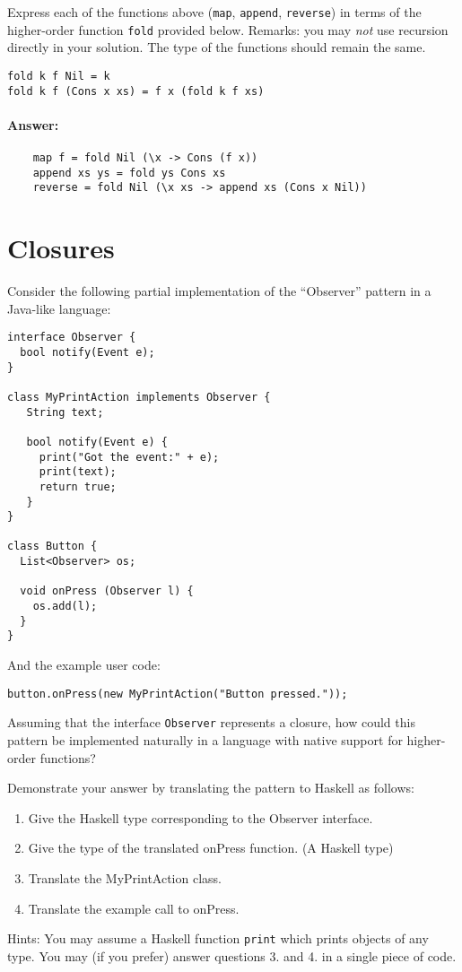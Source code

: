 \documentclass{article}
\newcommand{\answer}[0]{\paragraph{Answer:}}
\begin{document}
Express each of the functions above (\texttt{map}, \texttt{append},
\texttt{reverse})  in terms of the higher-order
function \texttt{fold} provided below.  Remarks: you may \emph{not}
use recursion directly in your solution. The type of the functions
should remain the same.

\begin{verbatim}
fold k f Nil = k
fold k f (Cons x xs) = f x (fold k f xs)
\end{verbatim}
\answer{
  \begin{verbatim}
    map f = fold Nil (\x -> Cons (f x))
    append xs ys = fold ys Cons xs
    reverse = fold Nil (\x xs -> append xs (Cons x Nil))
  \end{verbatim}
}
\newpage
\section{Closures}

Consider the following partial implementation of the ``Observer''
pattern in a Java-like language:
\begin{verbatim}
interface Observer {
  bool notify(Event e);
}

class MyPrintAction implements Observer {
   String text;

   bool notify(Event e) {
     print("Got the event:" + e);
     print(text);
     return true;
   }
}

class Button {
  List<Observer> os;

  void onPress (Observer l) {
    os.add(l);
  }
}
\end{verbatim}

And the example user code:

\begin{verbatim}
button.onPress(new MyPrintAction("Button pressed."));
\end{verbatim}

Assuming that the interface \texttt{Observer} represents a closure, how
could this pattern be implemented naturally in a language with native
support for higher-order functions?

Demonstrate your answer by translating the pattern to Haskell as
follows:
\begin{enumerate}
\item Give the Haskell type corresponding to the Observer interface.
\item Give the type of the translated onPress function. (A Haskell type) 
\item Translate the MyPrintAction class. 
\item Translate the example call to onPress. 
\end{enumerate}
Hints: You may assume a Haskell function \texttt{print} which prints
objects of any type.  You may (if you prefer) answer questions 3. and
4. in a single piece of code.
\end{document}

